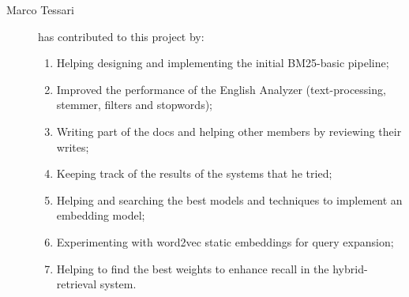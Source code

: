\begin{description}
    \item[Marco Tessari] has contributed to this project by:
    \begin{enumerate}
        \item Helping designing and implementing the initial BM25-basic pipeline;
        \item Improved the performance of the English Analyzer (text-processing, stemmer, filters and stopwords);
        \item Writing part of the docs and helping other members by reviewing their writes;
        \item Keeping track of the results of the systems that he tried;
        \item Helping and searching the best models and techniques to implement an embedding model;
        \item Experimenting with word2vec static embeddings for query expansion;
        \item Helping to find the best weights to enhance recall in the hybrid-retrieval system.
    \end{enumerate}
\end{description}
